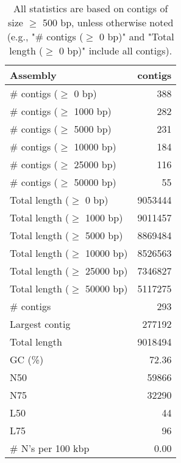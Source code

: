 \documentclass[12pt,a4paper]{article}
\begin{document}
\begin{table}[ht]
\begin{center}
\caption{All statistics are based on contigs of size $\geq$ 500 bp, unless otherwise noted (e.g., "\# contigs ($\geq$ 0 bp)" and "Total length ($\geq$ 0 bp)" include all contigs).}
\begin{tabular}{|l*{1}{|r}|}
\hline
Assembly & contigs \\ \hline
\# contigs ($\geq$ 0 bp) & 388 \\ \hline
\# contigs ($\geq$ 1000 bp) & 282 \\ \hline
\# contigs ($\geq$ 5000 bp) & 231 \\ \hline
\# contigs ($\geq$ 10000 bp) & 184 \\ \hline
\# contigs ($\geq$ 25000 bp) & 116 \\ \hline
\# contigs ($\geq$ 50000 bp) & 55 \\ \hline
Total length ($\geq$ 0 bp) & 9053444 \\ \hline
Total length ($\geq$ 1000 bp) & 9011457 \\ \hline
Total length ($\geq$ 5000 bp) & 8869484 \\ \hline
Total length ($\geq$ 10000 bp) & 8526563 \\ \hline
Total length ($\geq$ 25000 bp) & 7346827 \\ \hline
Total length ($\geq$ 50000 bp) & 5117275 \\ \hline
\# contigs & 293 \\ \hline
Largest contig & 277192 \\ \hline
Total length & 9018494 \\ \hline
GC (\%) & 72.36 \\ \hline
N50 & 59866 \\ \hline
N75 & 32290 \\ \hline
L50 & 44 \\ \hline
L75 & 96 \\ \hline
\# N's per 100 kbp & 0.00 \\ \hline
\end{tabular}
\end{center}
\end{table}
\end{document}
